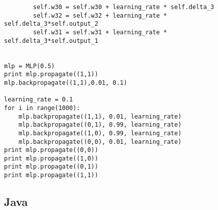 \documentclass[paper=a4, fontsize=11pt]{scrartcl} %
\numberwithin{equation}{section} %
\numberwithin{figure}{section} %
\numberwithin{table}{section} %
\begin{document}
\begin{lstlisting}
        self.w30 = self.w30 + learning_rate * self.delta_3
        self.w32 = self.w32 + learning_rate * self.delta_3*self.output_2
        self.w31 = self.w31 + learning_rate * self.delta_3*self.output_1

    
mlp = MLP(0.5)
print mlp.propagate((1,1))
mlp.backpropagate((1,1),0.01, 0.1)

learning_rate = 0.1
for i in range(1000):
    mlp.backpropagate((1,1), 0.01, learning_rate)
    mlp.backpropagate((0,1), 0.99, learning_rate)
    mlp.backpropagate((1,0), 0.99, learning_rate)
    mlp.backpropagate((0,0), 0.01, learning_rate)
print mlp.propagate((0,0))
print mlp.propagate((1,0))
print mlp.propagate((0,1))
print mlp.propagate((1,1))
\end{lstlisting}

\subsection{Java}
\end{document}
